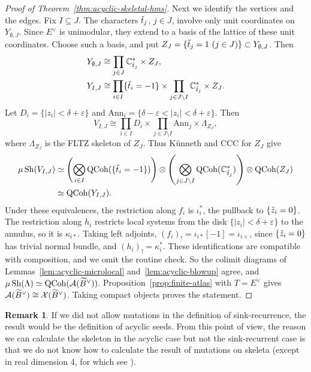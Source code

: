 \documentclass[12pt, letter]{amsart}
\theoremstyle{definition}
\newtheorem{remark}[dummy]{Remark}
\begin{document}
\begin{proof}[Proof of Theorem~\ref{thm:acyclic-skeletal-hms}]
Next we identify the vertices and the edges. Fix $I\subseteq J$.
The characters $\check t_j$, $j\in J$, involve only unit coordinates on $Y_{\emptyset,J}$.
Since $E^\vee$ is unimodular, they extend to a basis of the lattice of these unit coordinates.
Choose such a basis, and put $Z_J=\{\check t_j=1\ (j\in J)\}\subset Y_{\emptyset,J}$.
Then
\[
 \begin{aligned}
 Y_{\emptyset,J}&\cong\prod_{j\in J}\mathbb{C}^*_{\check t_j}\times Z_J,\\
 Y_{I,J}&\cong\prod_{i\in I}\{\check t_i=-1\}
 \times\prod_{j\in J\setminus I}\mathbb{C}^*_{\check t_j}\times Z_J.
 \end{aligned}
\]
Let $D_i=\{|z_i|<\delta+\varepsilon\}$ and $\mathrm{Ann}_i=\{\delta-\varepsilon<|z_i|<\delta+\varepsilon\}$.
Then
\[
 V_{I,J}\cong
 \prod_{i\in I}D_i\times\prod_{j\in J\setminus I}\mathrm{Ann}_j\times\Lambda_{Z_J},
\]
where $\Lambda_{Z_J}$ is the FLTZ skeleton of $Z_J$.
Thus K\"unneth and CCC for $Z_J$ give
\[
 \begin{aligned}
 \mu\operatorname{Sh}(V_{I,J})
 &\simeq
 \left(\bigotimes_{i\in I}\operatorname{QCoh}(\{\check t_i=-1\})\right)
 \otimes\left(\bigotimes_{j\in J\setminus I}\operatorname{QCoh}(\mathbb{C}^*_{\check t_j})\right)
 \otimes\operatorname{QCoh}(Z_J)\\
 &\simeq\operatorname{QCoh}(Y_{I,J}).
 \end{aligned}
\]
Under these equivalences, the restriction along $f_i$ is $ \iota_i^*$, the pullback to $\{\check z_i=0\}$.
The restriction along $h_i$ restricts local systems from the disk $\{|z_i|<\delta+\varepsilon\}$ to the annulus, so it is $ \kappa_{i*}$.
Taking left adjoints, $(f_i)_!=\iota_{i*}[-1]=\iota_{i\times}$, since $\{\check z_i=0\}$ has trivial normal bundle, and $(h_i)_!= \kappa_i^*$.
These identifications are compatible with composition, and we omit the routine check.
So the colimit diagrams of Lemmas~\ref{lem:acyclic-microlocal} and~\ref{lem:acyclic-blowup} agree, and $\mu\operatorname{Sh}(\Lambda)\simeq\operatorname{QCoh}(\mathcal{A}(\widetilde B^\vee))$. Proposition~\ref{prop:finite-atlas} with $T=E^\vee$ gives $\mathcal{A}(\widetilde B^\vee)\cong\mathcal{X}(\widetilde B^\vee)$. Taking compact objects proves the statement.
\end{proof}

\begin{remark}
    If we did not allow mutations in the definition of sink-recurrence, the result would be the definition of acyclic seeds.  From this point of view, the reason we can calculate the skeleton in the acyclic case but not the sink-recurrent case is that we do not know how to calculate the result of mutations on skeleta (except in real dimension 4, for which see \cite{STW}).  
\end{remark}
\end{document}
